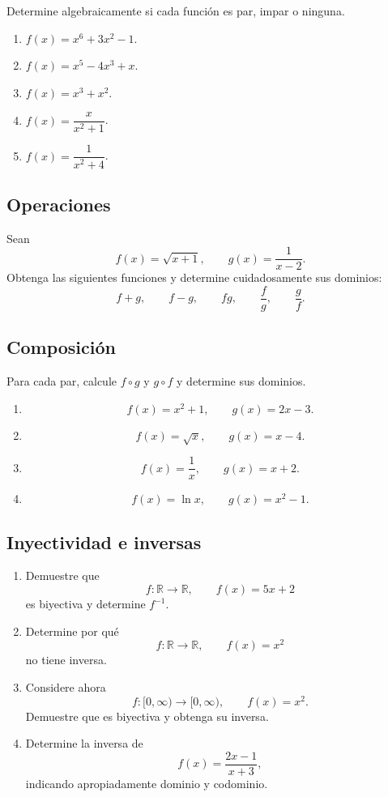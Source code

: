\documentclass[12pt]{article}
\theoremstyle{remark}
\newcommand{\R}{\mathbb{R}}
\begin{document}
Determine algebraicamente si cada función es par, impar o ninguna.

\begin{enumerate}
    \item $f(x)=x^6+3x^2-1$.
    \item $f(x)=x^5-4x^3+x$.
    \item $f(x)=x^3+x^2$.
    \item $f(x)=\dfrac{x}{x^2+1}$.
    \item $f(x)=\dfrac{1}{x^2+4}$.
\end{enumerate}

\subsection*{Operaciones}

Sean
\[
f(x)=\sqrt{x+1},
\qquad
g(x)=\frac{1}{x-2}.
\]
Obtenga las siguientes funciones y determine cuidadosamente sus dominios:
\[
f+g,\qquad f-g,\qquad fg,\qquad\frac fg,\qquad\frac gf.
\]

\subsection*{Composición}

Para cada par, calcule $f\circ g$ y $g\circ f$ y determine sus dominios.

\begin{enumerate}
    \item
    \[
    f(x)=x^2+1,\qquad g(x)=2x-3.
    \]
    \item
    \[
    f(x)=\sqrt{x},\qquad g(x)=x-4.
    \]
    \item
    \[
    f(x)=\frac1x,\qquad g(x)=x+2.
    \]
    \item
    \[
    f(x)=\ln x,\qquad g(x)=x^2-1.
    \]
\end{enumerate}

\subsection*{Inyectividad e inversas}

\begin{enumerate}
    \item Demuestre que
    \[
    f:\R\to\R,\qquad f(x)=5x+2
    \]
    es biyectiva y determine $f^{-1}$.

    \item Determine por qué
    \[
    f:\R\to\R,\qquad f(x)=x^2
    \]
    no tiene inversa.

    \item Considere ahora
    \[
    f:[0,\infty)\to[0,\infty),\qquad f(x)=x^2.
    \]
    Demuestre que es biyectiva y obtenga su inversa.

    \item Determine la inversa de
    \[
    f(x)=\frac{2x-1}{x+3},
    \]
    indicando apropiadamente dominio y codominio.
\end{enumerate}
\end{document}
